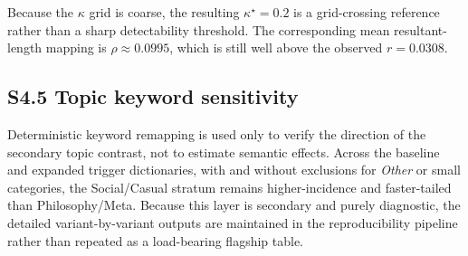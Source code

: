 Because the \(\kappa\) grid is coarse, the resulting \(\kappa^\star=0.2\) is a
grid-crossing reference rather than a sharp detectability threshold. The
corresponding mean resultant-length mapping is \(\rho\approx 0.0995\), which is
still well above the observed \(r=0.0308\).

\subsection*{S4.5 Topic keyword sensitivity}

Deterministic keyword remapping is used only to verify the direction of the
secondary topic contrast, not to estimate semantic effects. Across the baseline
and expanded trigger dictionaries, with and without exclusions for \emph{Other}
or small categories, the Social/Casual stratum remains higher-incidence and
faster-tailed than Philosophy/Meta. Because this layer is secondary and purely
diagnostic, the detailed variant-by-variant outputs are maintained in the
reproducibility pipeline rather than repeated as a load-bearing flagship table.
